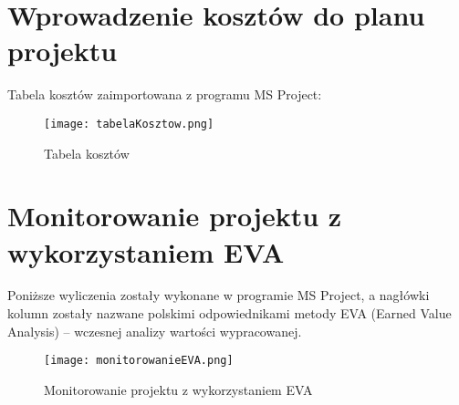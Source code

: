 
\section{Wprowadzenie kosztów do planu projektu}

Tabela kosztów zaimportowana z programu MS Project:

\begin{figure}[!h]
\centering
\texttt{[image: tabelaKosztow.png]}
\caption{Tabela kosztów}
\label{fig:tabelaKosztow}
\end{figure}


\section{Monitorowanie projektu z wykorzystaniem EVA}

Poniższe wyliczenia zostały wykonane w programie MS Project, a nagłówki kolumn zostały nazwane polskimi odpowiednikami metody EVA (Earned Value Analysis) – wczesnej analizy wartości wypracowanej.

\begin{figure}[!h]
\centering
\texttt{[image: monitorowanieEVA.png]}
\caption{Monitorowanie projektu z wykorzystaniem EVA}
\label{fig:monitorowanieEVA}
\end{figure}
